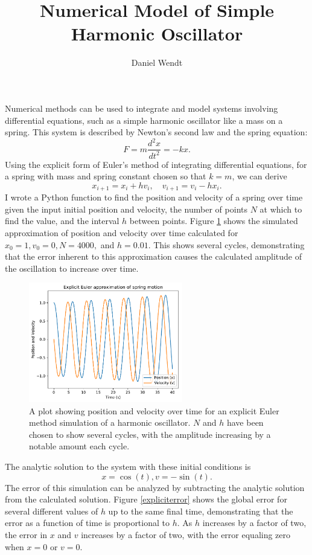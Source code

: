 \documentclass{article}
\title{Numerical Model of Simple Harmonic Oscillator}
\author{Daniel Wendt}
\begin{document}
\maketitle

Numerical methods can be used to integrate and model systems involving differential equations, such as a simple harmonic oscillator like a mass on a spring. This system is described by Newton's second law and the spring equation: $$F=m\frac{d^2x}{dt^2}=-kx.$$ Using the explicit form of Euler's method of integrating differential equations, for a spring with mass and spring constant chosen so that $k=m$, we can derive $$x_{i+1}=x_i+hv_i,\quad v_{i+1}=v_i-hx_i.$$ I wrote a Python function to find the position and velocity of a spring over time given the input initial position and velocity, the number of points $N$ at which to find the value, and the interval $h$ between points. Figure \ref{eulerexplicit} shows the simulated approximation of position and velocity over time calculated for $x_0=1,v_0=0,N=4000,$ and $h=0.01$. This shows several cycles, demonstrating that the error inherent to this approximation causes the calculated amplitude of the oscillation to increase over time. 

\begin{figure}[H]
	\centering
	\includegraphics[width=0.6\textwidth]{eulerexplicit.pdf}
	\caption{A plot showing position and velocity over time for an explicit Euler method simulation of a harmonic oscillator. $N$ and $h$ have been chosen to show several cycles, with the amplitude increasing by a notable amount each cycle.}
	\label{eulerexplicit}
\end{figure}

The analytic solution to the system with these initial conditions is $$x=\cos(t),v=-\sin(t).$$ The error of this simulation can be analyzed by subtracting the analytic solution from the calculated solution. Figure \ref{expliciterror} shows the global error for several different values of $h$ up to the same final time, demonstrating that the error as a function of time is proportional to $h$. As $h$ increases by a factor of two, the error in $x$ and $v$ increases by a factor of two, with the error equaling zero when $x=0$ or $v=0$.
\end{document}
